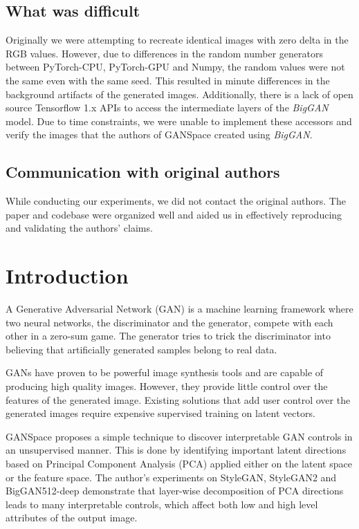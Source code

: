 \subsection*{What was difficult}

Originally we were attempting to recreate identical images with zero delta in the RGB values. However, due to differences in the random number generators between PyTorch-CPU, PyTorch-GPU and Numpy, the random values were not the same even with the same seed. This resulted in minute differences in the background artifacts of the generated images. Additionally, there is a lack of open source Tensorflow 1.x APIs to access the intermediate layers of the \textit{BigGAN} model. Due to time constraints, we were unable to implement these accessors and verify the images that the authors of GANSpace created using \textit{BigGAN}.

\subsection*{Communication with original authors}

While conducting our experiments, we did not contact the original authors. The paper and codebase were organized well and aided us in effectively reproducing and validating the authors' claims.

\newpage

\section{Introduction}

A Generative Adversarial Network (GAN)\cite{gan} is a machine learning framework where two neural networks, the discriminator and the generator, compete with each other in a zero-sum game. The generator tries to trick the discriminator into believing that artificially generated samples belong to real data.

GANs have proven to be powerful image synthesis tools and are capable of producing high quality images. However, they provide little control over the features of the generated image. Existing solutions\cite{supervised} that add user control over the generated images require expensive supervised training on latent vectors.

GANSpace\cite{GANSpace} proposes a simple technique to discover interpretable GAN controls in an unsupervised manner. This is done by identifying important latent directions based on Principal Component Analysis (PCA) applied either on the latent space or the feature space. The author's experiments on StyleGAN\cite{stylegan}, StyleGAN2\cite{stylegan2} and BigGAN512-deep\cite{biggan} demonstrate that layer-wise decomposition of PCA directions leads to many interpretable controls, which affect both low and high level attributes of the output image.


